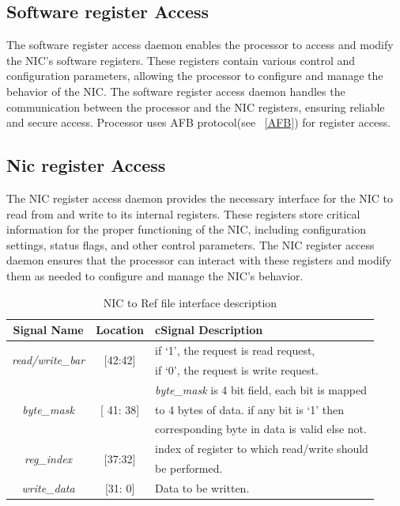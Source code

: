 \documentclass[12pt]{report}
\begin{document}
		\subsection{Software register Access}
				The software register access daemon enables the processor to access and modify the NIC's software registers. These registers contain various control and configuration parameters, allowing the processor to configure and manage the behavior of the NIC. The software register access daemon handles the communication between the processor and the NIC registers, ensuring reliable and secure access. Processor uses AFB protocol(see ~\ref{AFB}) for register access.\\

	

		\subsection{Nic register Access}
				The NIC register access daemon provides the necessary interface for the NIC to read from and write to its internal registers. These registers store critical information for the proper functioning of the NIC, including configuration settings, status flags, and other control parameters. The NIC register access daemon ensures that the processor can interact with these registers and modify them as needed to configure and manage the NIC's behavior.\\
		\begin{table}[!htbp]
					\centering
					\begin{tabular}{ccl}
						\hline
						\textbf{Signal Name} 			& \textbf{Location} 		&{c}\textbf{Signal Description}  \\ \hline
						\multirow{2}{*}{\textit{read/write\_bar}}& \multirow{2}{*}{[42:42]}	& if `1', the request is read request,\\ 
											& 				& if `0', the request is write request.\\ \hline
						\multirow{3}{*}{\textit{byte\_mask}}	& \multirow{3}{*}{[ 41: 38]}	& \textit{byte\_mask} is 4 bit field, each bit is mapped\\
											&				& to 4 bytes of data. if any bit is `1' then\\
											& 				& corresponding byte in data is valid else not.\\ \hline 
						\multirow{2}{*}{\textit{reg\_index}}   	& \multirow{2}{*}{[37:32]} 	& index of register to which read/write should\\ 
											&				& be performed.\\ \hline
						\textit{write\_data}   			& [31: 0] 			& Data to be written.\\ \hline
					\end{tabular}
					\caption{NIC to Ref file interface description}
					\label{tab:NIC-Reg-interface-req}
				\end{table}
\end{document}

